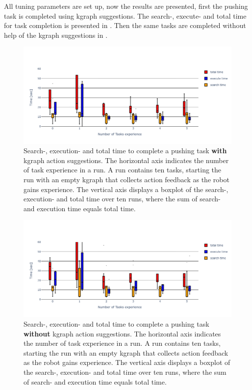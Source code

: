 All tuning parameters are set up, now the results are presented, first the pushing task is completed using \ac{kgraph} suggestions. The search-, execute- and total time for task completion is presented in . Then the same tasks are completed without help of the \ac{kgraph} suggestions in . 

\begin{figure}[H]
    \centering
    \includegraphics[width=\textwidth]{figures/results/random_push_time_kgraph}
    \caption{Search-, execution- and total time to complete a pushing task \textbf{with} \ac{kgraph} action suggestions. The horizontal axis indicates the number of task experience in a run. A run contains ten tasks, starting the run with an empty \ac{kgraph} that collects action feedback as the robot gains experience. The vertical axis displays a boxplot of the search-, execution- and total time over ten runs, where the sum of search- and execution time equals total time.}%
    \label{fig:random_push_time_kgraph}
\end{figure}

\begin{figure}[H]
    \centering
    \includegraphics[width=\textwidth]{figures/results/random_push_time_no_kgraph}
    \caption{Search-, execution- and total time to complete a pushing task \textbf{without} \ac{kgraph} action suggestions. The horizontal axis indicates the number of task experience in a run. A run contains ten tasks, starting the run with an empty \ac{kgraph} that collects action feedback as the robot gains experience. The vertical axis displays a boxplot of the search-, execution- and total time over ten runs, where the sum of search- and execution time equals total time.}%
    \label{fig:random_push_time_no_kgraph}
\end{figure}

